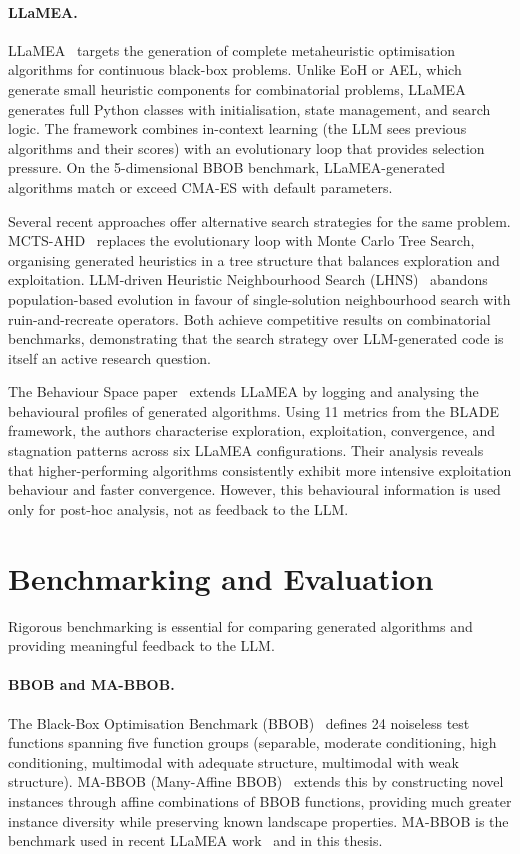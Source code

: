 \paragraph{LLaMEA.}
LLaMEA~\cite{vanStein2024LLaMEA} targets the generation of complete metaheuristic optimisation algorithms for continuous black-box problems. Unlike EoH or AEL, which generate small heuristic components for combinatorial problems, LLaMEA generates full Python classes with initialisation, state management, and search logic. The framework combines in-context learning (the LLM sees previous algorithms and their scores) with an evolutionary loop that provides selection pressure. On the 5-dimensional BBOB benchmark, LLaMEA-generated algorithms match or exceed CMA-ES with default parameters.

Several recent approaches offer alternative search strategies for the same problem. MCTS-AHD~\cite{zheng2025mctsahd} replaces the evolutionary loop with Monte Carlo Tree Search, organising generated heuristics in a tree structure that balances exploration and exploitation. LLM-driven Heuristic Neighbourhood Search (LHNS)~\cite{xie2025lhns} abandons population-based evolution in favour of single-solution neighbourhood search with ruin-and-recreate operators. Both achieve competitive results on combinatorial benchmarks, demonstrating that the search strategy over LLM-generated code is itself an active research question.

The Behaviour Space paper~\cite{vanStein2025Behaviour} extends LLaMEA by logging and analysing the behavioural profiles of generated algorithms. Using 11 metrics from the BLADE framework, the authors characterise exploration, exploitation, convergence, and stagnation patterns across six LLaMEA configurations. Their analysis reveals that higher-performing algorithms consistently exhibit more intensive exploitation behaviour and faster convergence. However, this behavioural information is used only for post-hoc analysis, not as feedback to the LLM.

\section{Benchmarking and Evaluation}
\label{sec:bg-benchmarking}

Rigorous benchmarking is essential for comparing generated algorithms and providing meaningful feedback to the LLM.

\paragraph{BBOB and MA-BBOB.}
The Black-Box Optimisation Benchmark (BBOB)~\cite{hansen2021coco} defines 24 noiseless test functions spanning five function groups (separable, moderate conditioning, high conditioning, multimodal with adequate structure, multimodal with weak structure). MA-BBOB (Many-Affine BBOB)~\cite{vermetten2023mabbob} extends this by constructing novel instances through affine combinations of BBOB functions, providing much greater instance diversity while preserving known landscape properties. MA-BBOB is the benchmark used in recent LLaMEA work~\cite{vanStein2026LLaMEASAGE} and in this thesis.

